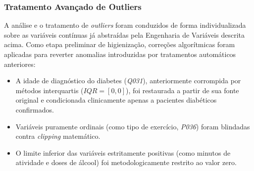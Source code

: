 \documentclass[12pt, a4paper]{article}
\begin{document}
\begin{table}[h]
    \centering
    \caption{Dicionário de Atributos Sintéticos (Engenharia de Variáveis)}
    \label{tab:eng_var}
\end{table}

    \subsubsection{Tratamento Avançado de Outliers}

    A análise e o tratamento de \textit{outliers} foram conduzidos de forma individualizada sobre as variáveis contínuas já abstraídas pela Engenharia de Variáveis descrita acima. Como etapa preliminar de higienização, correções algorítmicas foram aplicadas para reverter anomalias introduzidas por tratamentos automáticos anteriores:
    \begin{itemize}
        \item A idade de diagnóstico do diabetes (\textit{Q031}), anteriormente corrompida por métodos interquartis ($IQR=[0,0]$), foi restaurada a partir de sua fonte original e condicionada clinicamente apenas a pacientes diabéticos confirmados.
        \item Variáveis puramente ordinais (como tipo de exercício, \textit{P036}) foram blindadas contra \textit{clipping} matemático.
        \item O limite inferior das variáveis estritamente positivas (como minutos de atividade e doses de álcool) foi metodologicamente restrito ao valor zero.
    \end{itemize}
\end{document}
